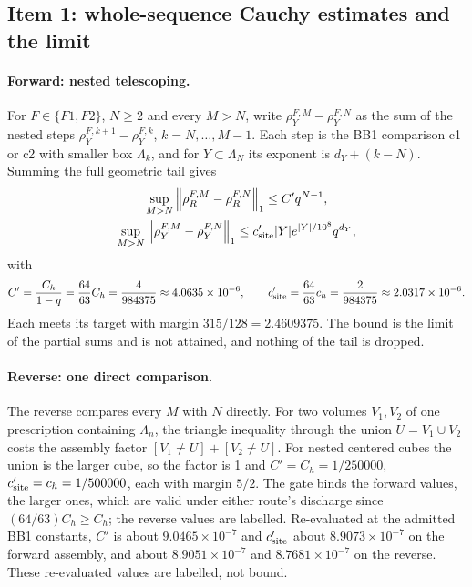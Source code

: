 \subsection{Item 1: whole-sequence Cauchy estimates and the limit}
\label{sec:bb2-item1}
\paragraph{Forward: nested telescoping.} For $F\in\{F1,F2\}$, $N\ge2$ and every
$M>N$, write $\rho^{F,M}_Y-\rho^{F,N}_Y$ as the sum of the nested steps
$\rho^{F,k+1}_Y-\rho^{F,k}_Y$, $k=N,\ldots,M-1$. Each step is the BB1
comparison c1 or c2 with smaller box $\Lambda_k$, and for
$Y\subset\Lambda_N$ its exponent is $d_Y+(k-N)$. Summing the full geometric
tail gives
\begin{equation}
 \begin{gathered}
 \sup_{M>N}\left\lVert\rho^{F,M}_R-\rho^{F,N}_R\right\rVert_1\le C'q^{N-1},\\
 \sup_{M>N}\left\lVert\rho^{F,M}_Y-\rho^{F,N}_Y\right\rVert_1\le c'_{\rm site}|Y|e^{|Y|/10^8}q^{d_Y},
 \end{gathered}
 \label{eq:bb2-cauchy}
\end{equation}
with
\begin{equation}
 C'=\frac{C_h}{1-q}=\frac{64}{63}C_h=\frac4{984375}\approx4.0635\times10^{-6},\qquad
 c'_{\rm site}=\frac{64}{63}c_h=\frac2{984375}\approx2.0317\times10^{-6}.
 \label{eq:bb2-Cprime}
\end{equation}
Each meets its target with margin $315/128=2.4609375$. The bound is the limit
of the partial sums and is not attained, and nothing of the tail is dropped.

\paragraph{Reverse: one direct comparison.} The reverse compares every $M$
with $N$ directly. For two volumes $V_1,V_2$ of one prescription containing
$\Lambda_n$, the triangle inequality through the union $U=V_1\cup V_2$ costs
the assembly factor $[V_1\ne U]+[V_2\ne U]$. For nested centered cubes the
union is the larger cube, so the factor is 1 and $C'=C_h=1/250000$,
$c'_{\rm site}=c_h=1/500000$, each with margin $5/2$. The gate binds the
forward values, the larger ones, which are valid under either route's
discharge since $(64/63)C_h\ge C_h$; the reverse values are labelled.
Re-evaluated at the admitted BB1 constants, $C'$ is about
$9.0465\times10^{-7}$ and $c'_{\rm site}$ about $8.9073\times10^{-7}$ on the
forward assembly, and about $8.9051\times10^{-7}$ and $8.7681\times10^{-7}$ on
the reverse. These re-evaluated values are labelled, not bound.

